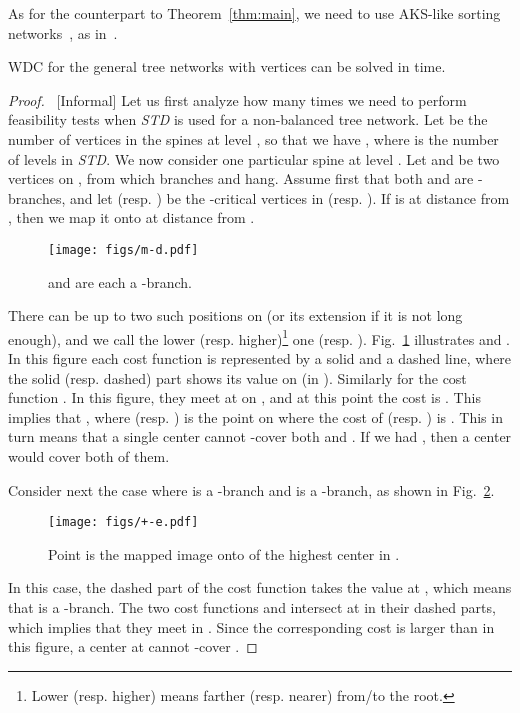 \documentclass{llncs}
\begin{document}
{As for the counterpart to Theorem~\ref{thm:main}, 
we need to use AKS-like sorting networks~\cite{ajtai1983,goodrich2014,paterson1990,seiferas2009},
as in~\cite{cole1987}.

\begin{theorem}\label{thm:general2}
WDC for the general tree networks with  vertices can be solved in
  time.
\end{theorem}
\begin{proof}
~[Informal]
Let us first analyze how many times we need to perform feasibility tests
when {\it STD} is used for a non-balanced tree network.
Let  be the number of vertices in the spines at level ,
so that we have ,
where  is the number of levels in {\it STD}.
We now consider one particular spine  at level .
Let  and  be two vertices on ,
from which branches  and  hang.
Assume first that both  and  are -branches,
and let  (resp. ) be the -critical vertices in
 (resp. ).
If  is at distance  from ,
then we map it onto  at distance  from .
\begin{figure}[ht]
\centering
\texttt{[image: figs/m-d.pdf]}
\caption{ and  are each a -branch. 
}
\label{fig:--d}
\end{figure}
There can be up to two such positions on  (or its extension if it is not long enough),
and we call the lower (resp. higher)\footnote{Lower (resp. higher) means farther (resp. nearer) from/to
the root.}
one  (resp. ).
Fig.~\ref{fig:--d} illustrates  and .
In this figure each cost function 
is represented by a solid and a dashed line,
where the solid (resp. dashed) part shows its value on  (in ).
Similarly for the cost function .
In this figure, they meet at  on ,
and at this point the cost is .
This implies that ,
where  (resp. ) is the point on  where the cost of
 (resp. ) is .
This in turn means that a single center cannot -cover both 
and .
If we had ,
then a center would cover both of them.

Consider next the case where  is a -branch and  is a -branch,
as shown in Fig.~\ref{fig:+-d}.
\begin{figure}[ht]
\centering
\texttt{[image: figs/+-e.pdf]}
\caption{
Point  is the mapped image onto  of the highest center in .
}
\label{fig:+-d}
\end{figure}
In this case, the dashed part of the cost function 
takes the value  at ,
which means that  is a -branch.
The two cost functions  and 
 intersect at  in their dashed parts,
which implies that they meet in .
Since the corresponding cost  is larger than  in this figure,
a center at  cannot -cover .


\end{proof}}
\end{document}
